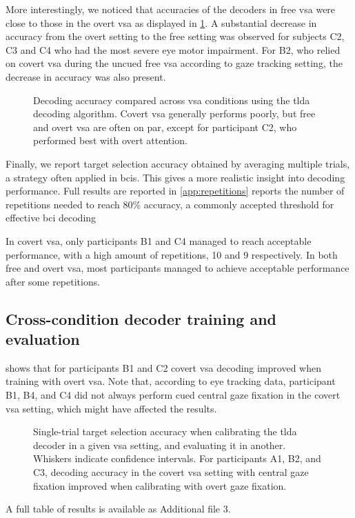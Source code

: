 \documentclass{article}
\begin{document}
More interestingly, we noticed that accuracies of the decoders in free
\ac{vsa} were close to those in the overt \ac{vsa} as displayed in \cref{fig:results/decode/modes}.
A substantial decrease in accuracy from the overt setting to the free
setting was observed for subjects C2, C3 and C4 who had the most severe eye
motor impairment.
For B2, who relied on covert \ac{vsa} during the uncued free \ac{vsa}
according to gaze tracking setting, the decrease in accuracy was also
present.
\begin{figure}
	
	\caption{%
		Decoding accuracy compared across \ac{vsa} conditions using the \ac{tlda}
		decoding algorithm.
		Covert \ac{vsa} generally performs poorly, but free and overt \ac{vsa} are
		often on par, except for participant C2, who performed best with
		overt attention.
	}%
	\label{fig:results/decode/modes}
\end{figure}

Finally, we report target selection accuracy obtained by averaging multiple
trials, a strategy often applied in \acp{bci}.
This gives a more realistic insight into decoding performance.
Full results are reported in \cref{app:repetitions}
 reports the number of repetitions needed to reach 80\% accuracy,
a commonly accepted threshold for effective \ac{bci} decoding~\cite{RonAngevin2019}
\begin{table}
	
	\caption{Number of repetitions needed to reach 80\% accuracy with the \ac{tlda}
		decoder}
	\label{tab:results/80-percent}
\end{table}
In covert \ac{vsa}, only participants B1 and C4 managed to reach acceptable performance,
with a high amount of repetitions, 10 and 9 respectively.
In both free and overt \ac{vsa}, most participants managed to achieve acceptable
performance after some repetitions.

\subsection{Cross-condition decoder training and evaluation}%
\label{sec:patients/outcomes/cross}


 shows that for participants B1 and C2 covert \ac{vsa} decoding
improved when training with overt \ac{vsa}.
Note that, according to eye tracking data, participant B1, B4, and C4 did not
always perform cued central gaze fixation in the covert \ac{vsa} setting,
which might have affected the results.
\begin{figure}
	
	\caption{%
		Single-trial target selection accuracy
		when calibrating the \ac{tlda} decoder in a given \ac{vsa}
		setting, and evaluating it in another.
		Whiskers indicate confidence intervals.		For participants A1, B2, and C3, decoding accuracy in the covert \ac{vsa} setting with central gaze fixation
		improved when calibrating with overt gaze fixation.
	}%
	\label{fig:patients/cross}
\end{figure}
A full table of results is available as Additional file 3.
\end{document}
